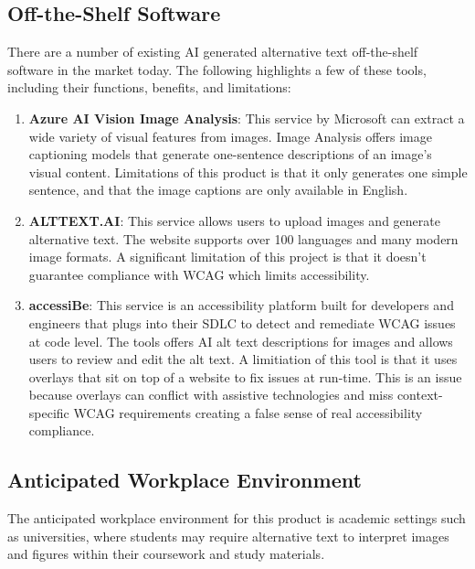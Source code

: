 \documentclass[12pt]{article}
\begin{document}
\subsection{Off-the-Shelf Software}
There are a number of existing AI generated alternative text
off-the-shelf software in the market today. The following
highlights a few of these tools, including their functions, benefits,
and limitations:
\begin{enumerate}
  \item \textbf{Azure AI Vision Image Analysis}: This service by
    Microsoft can extract a wide variety of
    visual features from images. Image Analysis offers image
    captioning models that generate one-sentence descriptions of an
    image's visual content.
    Limitations of this product is that it only generates one simple
    sentence, and that the image
    captions are only available in English.
  \item \textbf{ALTTEXT.AI}: This service allows users to upload
    images and generate alternative text. The website supports
    over 100 languages and many modern image formats. A significant
    limitation of this project
    is that it doesn't guarantee compliance with WCAG which limits
    accessibility.
  \item \textbf{accessiBe}: This service is an accessibility platform
    built for developers and engineers that plugs into their SDLC to detect and
    remediate WCAG issues at code level. The tools offers AI alt text
    descriptions for images and allows users to review
    and edit the alt text. A limitiation of this tool is that it uses
    overlays that sit on top of a website to fix issues at run-time.
    This is an issue
    because overlays can conflict with assistive technologies and
    miss context-specific WCAG requirements creating a false sense of
    real accessibility compliance.
\end{enumerate}
\subsection{Anticipated Workplace Environment}
The anticipated workplace environment for this product is academic
settings such as universities, where students may
require alternative text to interpret images and figures within their
coursework and study materials.
\end{document}
